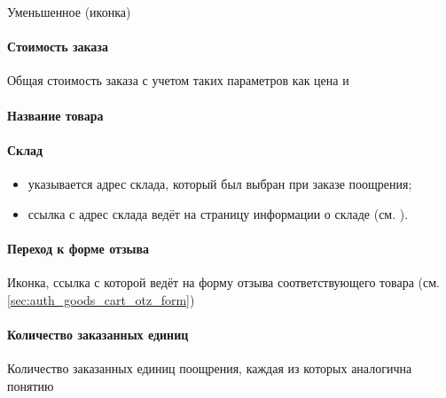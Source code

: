                     \par{
                    Уменьшенное (иконка)
                    }

                \paragraph{Стоимость заказа}

                    \par{
                    Общая стоимость заказа с учетом таких параметров как 
                    цена и 
                    }

                \paragraph{Название товара}
                \paragraph{Склад}

                    \begin{itemize}
                        \item указывается адрес склада, который был выбран при
                        заказе поощрения;
                        \item ссылка с адрес склада ведёт на страницу 
                        информации о складе (см. \label{sec:page_address}).
                    \end{itemize}

                \paragraph{Переход к форме отзыва}

                    \par{
                    Иконка, ссылка с которой ведёт на форму отзыва
                    соответствующего товара 
                    (см.\ref{sec:auth_goods_cart_otz_form})
                    }

                \paragraph{Количество заказанных единиц}

                    \par{
                    Количество заказанных единиц поощрения, каждая из которых
                    аналогична понятию 
                    }

